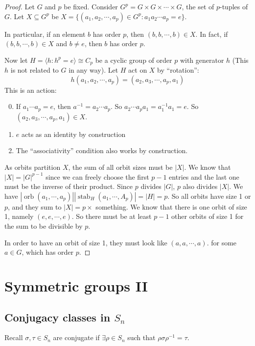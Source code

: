 \documentclass[a4paper]{article}
\theoremstyle{definition}
\newcommand{\bra}{\langle}
\newcommand{\ket}{\rangle}
\let\stdsection\section
\renewcommand\section{\newpage\stdsection}
\DeclareMathOperator\orb{orb}
\DeclareMathOperator\stab{stab}
\begin{document}
\begin{proof}
  Let $G$ and $p$ be fixed. Consider $G^p = G\times G\times \cdots \times G$, the set of $p$-tuples of $G$. Let $X \subseteq G^p$ be $X = \{(a_1, a_2, \cdots, a_p)\in G^p: a_1a_2\cdots a_p = e\}$.

In particular, if an element $b$ has order $p$, then $(b, b, \cdots, b)\in X$. In fact, if $(b, b, \cdots, b)\in X$ and $b\not= e$, then $b$ has order $p$.

Now let $H = \bra h: h^p = e\ket\cong C_p$ be a cyclic group of order $p$ with generator $h$ (This $h$ is not related to $G$ in any way). Let $H$ act on $X$ by ``rotation'':
\[
h(a_1, a_2, \cdots, a_p) = (a_2, a_3, \cdots, a_p, a_1)
\]
This is an action:
\begin{enumerate}[label=\arabic{*}.]
\setcounter{enumi}{-1}
\item If $a_1\cdots a_p = e$, then $a^{-1} = a_2\cdots a_p$. So $a_2\cdots a_pa_1 = a_1^{-1}a_1 = e$. So $(a_2, a_3, \cdots, a_p, a_1)\in X$.
\item $e$ acts as an identity by construction
\item The ``associativity'' condition also works by construction. 
\end{enumerate}

As orbits partition $X$, the sum of all orbit sizes must be $|X|$. We know that $|X| = |G|^{p - 1}$ since we can freely choose the first $p - 1$ entries and the last one must be the inverse of their product. Since $p$ divides $|G|$, $p$ also divides $|X|$. We have $|\orb(a_1, \cdots , a_p)||\stab_H(a_1, \cdots, A_p)| = |H| = p$. So all orbits have size 1 or $p$, and they sum to $|X| = p\times$ something. We know that there is one orbit of size 1, namely $(e, e, \cdots, e)$. So there must be at least $p - 1$ other orbits of size 1 for the sum to be divisible by $p$.

In order to have an orbit of size 1, they must look like ${(a, a, \cdots, a)}$.  for some $a\in G$, which has order $p$.
\end{proof}

\section{Symmetric groups II}
\subsection{Conjugacy classes in \texorpdfstring{$S_n$}{Sn}}
Recall $\sigma, \tau\in S_n$ are conjugate if $\exists \rho\in S_n$ such that $\rho \sigma\rho^{-1} = \tau$.
\end{document}
